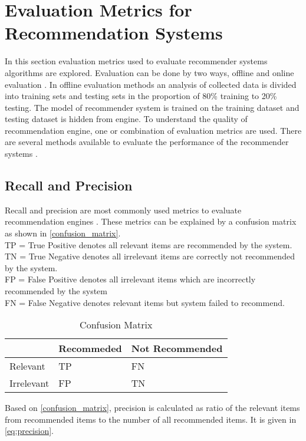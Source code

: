 
\section{Evaluation Metrics for Recommendation Systems}
\label{sec:eval_metrics}

In this section evaluation metrics used to evaluate recommender systems algorithms are explored. Evaluation can be done by two ways, offline and online evaluation \cite{22,23}. In offline evaluation methods an analysis of collected data is divided into training sets and testing sets in the proportion of 80\% training to 20\% testing. The model of recommender system is trained on the training dataset and testing dataset is hidden from engine. To understand the quality of recommendation engine, one or combination of evaluation metrics are used. There are several methods available to evaluate the performance of the recommender systems \cite{22,24}. 
  
\subsection{Recall and Precision}
Recall and precision are most commonly used metrics to evaluate recommendation engines \cite{25}. These metrics can be explained by a confusion matrix \cite{21} as shown in \autoref{confusion_matrix}. \\
\noindent
TP = True Positive denotes all relevant items are recommended by the system.\\
TN = True Negative denotes all irrelevant items are correctly not recommended by the system.  \\
FP = False Positive denotes all irrelevant items which are
incorrectly recommended by the system\\
FN = False Negative denotes relevant items but system failed to recommend.\\

\begin{table}[]
\centering 
\begin{tabular}{|l|l|l|}
\hline
\rowcolor[HTML]{C0C0C0} 
\textbf{}  & \textbf{Recommeded} & \textbf{Not Recommended} \\ \hline
Relevant   & TP                  & FN                       \\ \hline
Irrelevant & FP                  & TN                       \\ \hline
\end{tabular}
\caption{Confusion Matrix \cite{21}}
\label{confusion_matrix}
\end{table}
\noindent Based on \autoref{confusion_matrix}, precision is calculated as ratio of the relevant items from recommended items to the number of all recommended items. It is given in \autoref{eq:precision}. 

